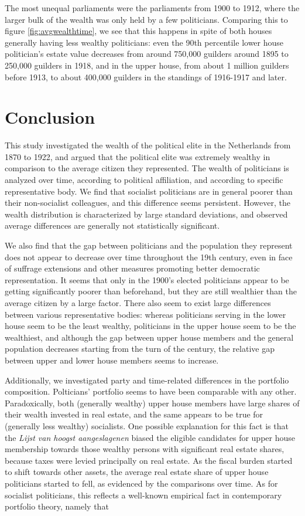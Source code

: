     The most unequal parliaments were the parliaments from 1900 to 1912, where the larger bulk of the wealth was only held by a few politicians. Comparing this to figure \ref{fig:avgwealthtime}, we see that this happens in spite of both houses generally having less wealthy politicians: even the 90th percentile lower house politician's estate value decreases from around 750,000 guilders around 1895 to 250,000 guilders in 1918, and in the upper house, from about 1 million guilders before 1913, to about 400,000 guilders in the standings of 1916-1917 and later. 
    

\section{Conclusion}

This study investigated the wealth of the political elite in the Netherlands from 1870 to 1922, and argued that the political elite was extremely wealthy in comparison to the average citizen they represented. The wealth of politicians is analyzed over time, according to political affiliation, and according to specific representative body. We find that socialist politicians are in general poorer than their non-socialist colleagues, and this difference seems persistent. However, the wealth distribution is characterized by large standard deviations, and observed average differences are generally not statistically significant. 

We also find that the gap between politicians and the population they represent does not appear to decrease over time throughout the 19th century, even in face of suffrage extensions and other measures promoting better democratic representation. It seems that only in the 1900's elected politicians appear to be getting significantly poorer than beforehand, but they are still wealthier than the average citizen by a large factor. There also seem to exist large differences between various representative bodies: whereas politicians serving in the lower house seem to be the least wealthy, politicians in the upper house seem to be the wealthiest, and although the gap between upper house members and the general population decreases starting from the turn of the century, the relative gap between upper and lower house members seems to increase. 

Additionally, we investigated party and time-related differences in the portfolio composition. Polticians' portfolio seems to have been comparable with any other. Paradoxically, both (generally wealthy) upper house members have large shares of their wealth invested in real estate, and the same appears to be true for (generally less wealthy) socialists. One possible explanation for this fact is that the \textit{Lijst van hoogst aangeslagenen} biased the eligible candidates for upper house membership towards those wealthy persons with significant real estate shares, because taxes were levied principally on real estate. As the fiscal burden started to shift towards other assets, the average real estate share of upper house politicians started to fell, as evidenced by the comparisons over time. As for socialist politicians, this reflects a well-known empirical fact in contemporary portfolio theory, namely that 

